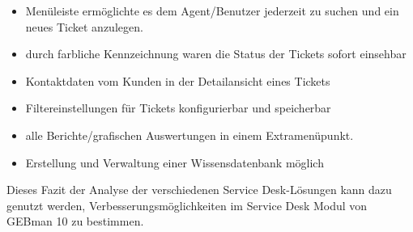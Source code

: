\begin{itemize}
\item Menüleiste ermöglichte es dem Agent/Benutzer jederzeit zu suchen und ein neues Ticket anzulegen.
		 
\item durch farbliche Kennzeichnung waren die Status der Tickets sofort einsehbar
		
\item  Kontaktdaten vom Kunden in der Detailansicht eines Tickets

\item Filtereinstellungen für Tickets konfigurierbar und speicherbar

\item alle Berichte/grafischen Auswertungen in einem Extramenüpunkt.

\item Erstellung und Verwaltung einer Wissensdatenbank möglich
\end{itemize}

\noindent
Dieses Fazit der Analyse der verschiedenen Service Desk-Lösungen kann dazu genutzt werden, Verbesserungsmöglichkeiten im Service Desk Modul von GEBman 10 zu  bestimmen. 
